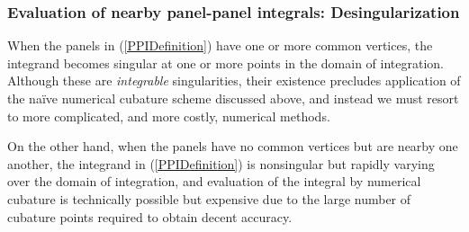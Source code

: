 \documentclass[letterpaper]{article}
\begin{document}
\subsubsection*{Evaluation of nearby panel-panel integrals: Desingularization}

When the panels in (\ref{PPIDefinition}) have one or more common
vertices, the integrand becomes singular at one or more points in 
the domain of integration. Although these are \textit{integrable}
singularities, their existence precludes application of the na\"ive
numerical cubature scheme discussed above, and instead we must
resort to more complicated, and more costly, numerical methods.

On the other hand, when the panels have no common vertices but are
nearby one another, the integrand in (\ref{PPIDefinition}) is
nonsingular but rapidly varying over the domain of integration, 
and evaluation of the integral by numerical cubature is technically 
possible but expensive due to the large number of cubature points 
required to obtain decent accuracy.
\end{document}
